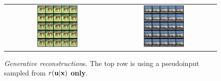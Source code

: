\begin{figure}[t]
\begin{center}
    \begin{tabular}{cc}
        \includegraphics[width=0.4\textwidth]{pics/5_dvp/cifar10_generative_rec_6.pdf} &
        \includegraphics[width=0.4\textwidth]{pics/5_dvp/cifar10_generative_rec_9.pdf} \\ 
    \end{tabular}
\end{center}
    \caption{\textit{Generative reconstruction}s. The top row is using a pseudoinput sampled from $r({\mathbf{u}}|{\mathbf{x}})$ \textbf{only}.}
    \label{fig:generative_recon}
    \vskip 10pt
\end{figure}
